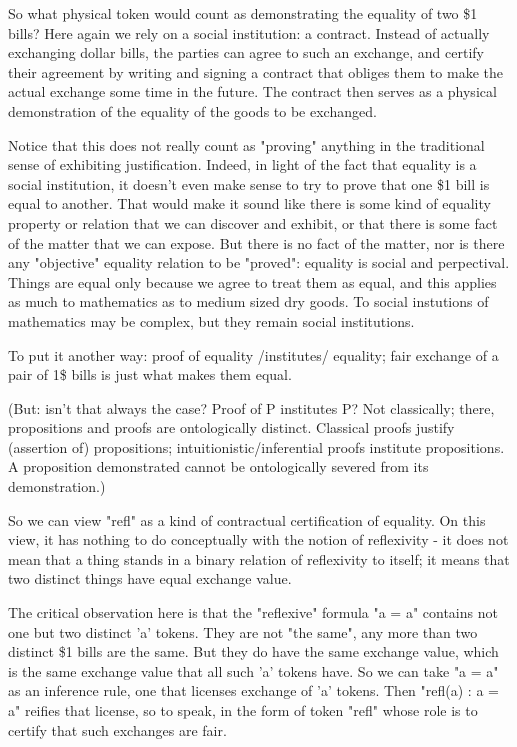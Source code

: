 \documentclass{article}
\begin{document}
So what physical token would count as demonstrating the equality of
two \$1 bills?  Here again we rely on a social institution: a contract.
Instead of actually exchanging dollar bills, the parties can agree to
such an exchange, and certify their agreement by writing and signing a
contract that obliges them to make the actual exchange some time in
the future.  The contract then serves as a physical demonstration of
the equality of the goods to be exchanged.

Notice that this does not really count as "proving" anything in the
traditional sense of exhibiting justification.  Indeed, in light of
the fact that equality is a social institution, it doesn't even make
sense to try to prove that one \$1 bill is equal to another.  That
would make it sound like there is some kind of equality property or
relation that we can discover and exhibit, or that there is some fact
of the matter that we can expose.  But there is no fact of the matter,
nor is there any "objective" equality relation to be "proved":
equality is social and perpectival.  Things are equal only because we
agree to treat them as equal, and this applies as much to mathematics
as to medium sized dry goods.  To social instutions of mathematics may
be complex, but they remain social institutions.

To put it another way: proof of equality /institutes/ equality; fair
exchange of a pair of 1\$ bills is just what makes them equal.

(But: isn't that always the case?  Proof of P institutes P?  Not
classically; there, propositions and proofs are ontologically
distinct.  Classical proofs justify (assertion of) propositions;
intuitionistic/inferential proofs institute propositions.  A
proposition demonstrated cannot be ontologically severed from its
demonstration.)

So we can view "refl" as a kind of contractual certification of
equality.  On this view, it has nothing to do conceptually with the
notion of reflexivity - it does not mean that a thing stands in a
binary relation of reflexivity to itself; it means that two distinct
things have equal exchange value.

The critical observation here is that the "reflexive" formula "a = a"
contains not one but two distinct 'a' tokens.  They are not "the
same", any more than two distinct \$1 bills are the same.  But they do
have the same exchange value, which is the same exchange value that
all such 'a' tokens have.  So we can take "a = a" as an inference
rule, one that licenses exchange of 'a' tokens.  Then "refl(a) : a = a"
reifies that license, so to speak, in the form of token "refl" whose
role is to certify that such exchanges are fair.
\end{document}
